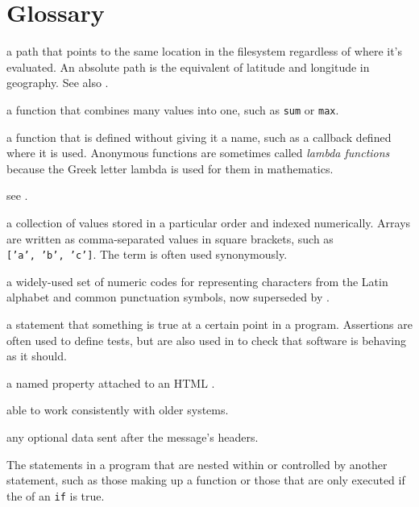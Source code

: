 \chapter{Glossary}\label{s:gloss}

\begin{description}

a path that points to the same location in the filesystem regardless of where
it's evaluated. An absolute path is the equivalent of latitude and longitude
in geography. See also .

a function that combines many values into one, such as \texttt{sum} or \texttt{max}.

a function that is defined without giving it a name, such as a callback
defined where it is used. Anonymous functions are sometimes called \emph{lambda
functions} because the Greek letter lambda is used for them in mathematics.

see .

a collection of values stored in a particular order and indexed numerically.
Arrays are written as comma-separated values in square brackets, such as
\texttt{['a',\ 'b',\ 'c']}. The term  is often used synonymously.

a widely-used set of numeric codes for representing characters from the Latin
alphabet and common punctuation symbols, now superseded by
.

a statement that something is true at a certain point in a program.
Assertions are often used to define tests, but are also used in  to check that software is behaving as it should.

a named property attached to an HTML .

able to work consistently with older systems.

any optional data sent after the message's headers.

The statements in a program that are nested within or controlled by another statement,
such as those making up a function or those that are only executed
if the  of an \texttt{if} is true.


\end{description}
